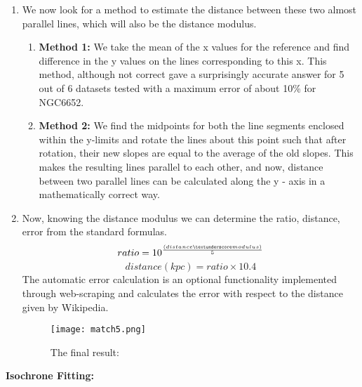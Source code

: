 \documentclass{article}
\begin{document}
\begin{enumerate}
    \item We now look for a method to estimate the distance between these two almost parallel lines, which will also be the distance modulus.
    \begin{enumerate}
        \item \textbf{Method 1:}  We take the mean of the x values for the reference and find difference in the y values on the lines corresponding to this x.\newline
        This method, although not correct gave a surprisingly accurate answer for 5 out of 6 datasets tested with a maximum error of about 10\% for NGC6652.
        \item \textbf{Method 2:} We find the midpoints for both the line segments enclosed within the y-limits and rotate the lines about this point such that after rotation, their new slopes are equal to the average of the old slopes. This makes the resulting lines parallel to each other, and now, distance between two parallel lines can be calculated along the y - axis in a mathematically correct way.
    \end{enumerate}
    \item Now, knowing the distance modulus we can determine the ratio, distance, error from the standard formulas.
    $$ratio = 10^{\frac{(distance\textunderscore modulus)}{5}}$$
    $$distance(kpc) = ratio\times 10.4$$
    The automatic error calculation is an optional functionality implemented through web-scraping and calculates the error with respect to the distance given by Wikipedia.
    \begin{figure}[H]
    \caption{The final result:}
    \centering
    \texttt{[image: match5.png]}
    \end{figure}\newpage
\end{enumerate}
\textbf{\Large Isochrone Fitting: }\newline
\end{document}
